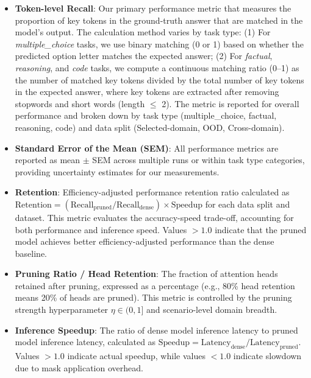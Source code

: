 \begin{itemize}
    \item \textbf{Token-level Recall}: Our primary performance metric that measures the proportion of key tokens in the ground-truth answer that are matched in the model's output. The calculation method varies by task type: (1) For \emph{multiple\_choice} tasks, we use binary matching (0 or 1) based on whether the predicted option letter matches the expected answer; (2) For \emph{factual}, \emph{reasoning}, and \emph{code} tasks, we compute a continuous matching ratio (0--1) as the number of matched key tokens divided by the total number of key tokens in the expected answer, where key tokens are extracted after removing stopwords and short words (length $\leq$ 2). The metric is reported for overall performance and broken down by task type (multiple\_choice, factual, reasoning, code) and data split (Selected-domain, OOD, Cross-domain).
    
    \item \textbf{Standard Error of the Mean (SEM)}: All performance metrics are reported as mean $\pm$ SEM across multiple runs or within task type categories, providing uncertainty estimates for our measurements.
    
    \item \textbf{Retention}: Efficiency-adjusted performance retention ratio calculated as $\text{Retention} = (\text{Recall}_{\text{pruned}} / \text{Recall}_{\text{dense}}) \times \text{Speedup}$ for each data split and dataset. This metric evaluates the accuracy-speed trade-off, accounting for both performance and inference speed. Values $>1.0$ indicate that the pruned model achieves better efficiency-adjusted performance than the dense baseline.
    
    \item \textbf{Pruning Ratio / Head Retention}: The fraction of attention heads retained after pruning, expressed as a percentage (e.g., 80\% head retention means 20\% of heads are pruned). This metric is controlled by the pruning strength hyperparameter $\eta \in (0,1]$ and scenario-level domain breadth.
    
    \item \textbf{Inference Speedup}: The ratio of dense model inference latency to pruned model inference latency, calculated as $\text{Speedup} = \text{Latency}_{\text{dense}} / \text{Latency}_{\text{pruned}}$. Values $>1.0$ indicate actual speedup, while values $<1.0$ indicate slowdown due to mask application overhead.
    

\end{itemize}
